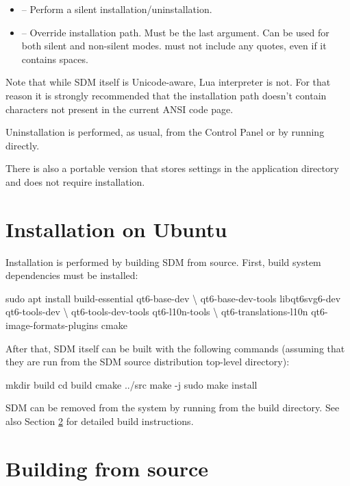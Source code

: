 \documentclass[a4paper,12pt,twoside,extrafontsizes]{memoir}
\begin{document}
\begin{itemize}
	\item {} -- Perform a silent installation/uninstallation.
	\item {} -- Override installation path. Must be the last argument. Can be used for both silent and non-silent modes.  must not include any quotes, even if it contains spaces.
\end{itemize}

Note that while SDM itself is Unicode-aware, Lua interpreter is not. For that reason it is strongly recommended that the installation path doesn't contain characters not present in the current ANSI code page.

Uninstallation is performed, as usual, from the Control Panel or by running  directly.

There is also a portable version that stores settings in the application directory and does not require installation.

\section{Installation on Ubuntu}

Installation is performed by building SDM from source. First, build system dependencies must be installed:

\begin{shellcmds}
sudo apt install build-essential qt6-base-dev \textbackslash
    qt6-base-dev-tools libqt6svg6-dev qt6-tools-dev \textbackslash
    qt6-tools-dev-tools qt6-l10n-tools \textbackslash
    qt6-translations-l10n qt6-image-formats-plugins cmake
\end{shellcmds}

After that, SDM itself can be built with the following commands (assuming that they are run from the SDM source distribution top-level directory):

\begin{shellcmds}
mkdir build
cd build
cmake ../src
make -j
sudo make install
\end{shellcmds}

SDM can be removed from the system by running  from the build directory. See also Section \ref{sec:buildsource} for detailed build instructions.

\section{Building from source}
\label{sec:buildsource}
\end{document}
